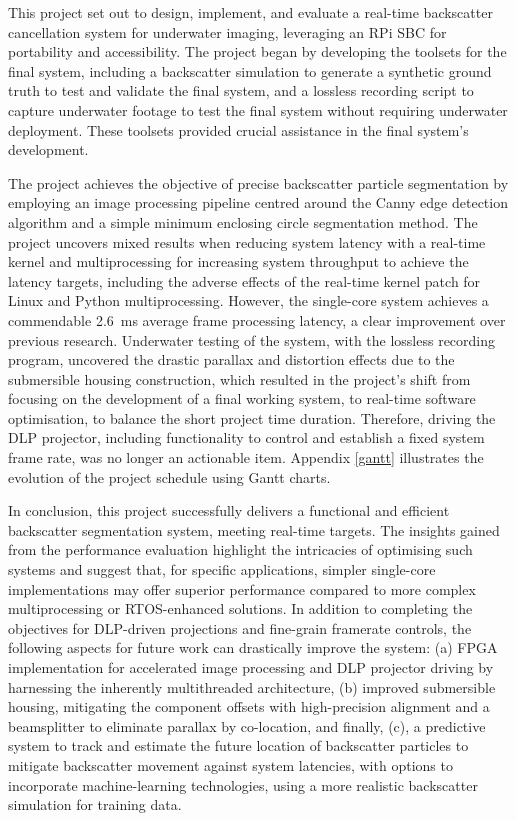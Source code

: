 This project set out to design, implement, and evaluate a real-time backscatter cancellation system for underwater imaging, leveraging an RPi SBC for portability and accessibility. The project began by developing the toolsets for the final system, including a backscatter simulation to generate a synthetic ground truth to test and validate the final system, and a lossless recording script to capture underwater footage to test the final system without requiring underwater deployment. These toolsets provided crucial assistance in the final system's development.

The project achieves the objective of precise backscatter particle segmentation by employing an image processing pipeline centred around the Canny edge detection algorithm and a simple minimum enclosing circle segmentation method. The project uncovers mixed results when reducing system latency with a real-time kernel and multiprocessing for increasing system throughput to achieve the latency targets, including the adverse effects of the real-time kernel patch for Linux and Python multiprocessing. However, the single-core system achieves a commendable \SI{2.6}{\milli\second} average frame processing latency, a clear improvement over previous research. Underwater testing of the system, with the lossless recording program, uncovered the drastic parallax and distortion effects due to the submersible housing construction, which resulted in the project's shift from focusing on the development of a final working system, to real-time software optimisation, to balance the short project time duration. Therefore, driving the DLP projector, including functionality to control and establish a fixed system frame rate, was no longer an actionable item. Appendix \ref{gantt} illustrates the evolution of the project schedule using Gantt charts.

In conclusion, this project successfully delivers a functional and efficient backscatter segmentation system, meeting real-time targets. The insights gained from the performance evaluation highlight the intricacies of optimising such systems and suggest that, for specific applications, simpler single-core implementations may offer superior performance compared to more complex multiprocessing or RTOS-enhanced solutions. In addition to completing the objectives for DLP-driven projections and fine-grain framerate controls, the following aspects for future work can drastically improve the system: (a) FPGA implementation for accelerated image processing and DLP projector driving by harnessing the inherently multithreaded architecture, (b) improved submersible housing, mitigating the component offsets with high-precision alignment and a beamsplitter to eliminate parallax by co-location, and finally, (c), a predictive system to track and estimate the future location of backscatter particles to mitigate backscatter movement against system latencies, with options to incorporate machine-learning technologies, using a more realistic backscatter simulation for training data.
